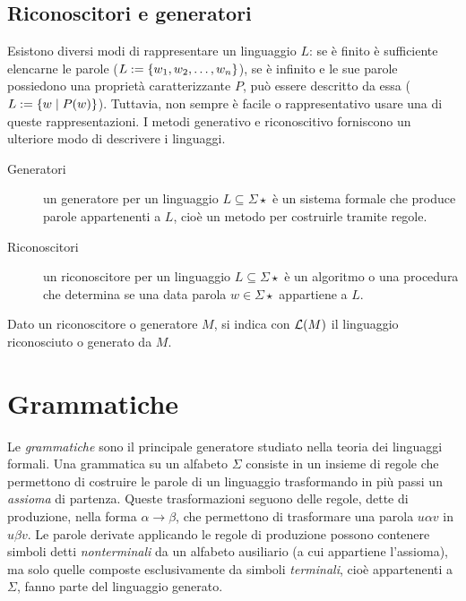 \subsection*{Riconoscitori e generatori}
Esistono diversi modi di rappresentare un linguaggio $L$: se è finito è sufficiente elencarne le parole ($L:=\left\{ w_1,w_2,\dots,w_n \right\}$), se è infinito e le sue parole possiedono una proprietà caratterizzante $P$, può essere descritto da essa ($L:=\left\{ w\mid P(w) \right\}$). Tuttavia, non sempre è facile o rappresentativo usare una di queste rappresentazioni. I metodi generativo e riconoscitivo forniscono un ulteriore modo di descrivere i linguaggi.

\begin{description}
	\item[Generatori] un generatore per un linguaggio $L\subseteq\Sigma\star$ è un sistema formale che produce parole appartenenti a $L$, cioè un metodo per costruirle tramite regole.
	\item[Riconoscitori] un riconoscitore per un linguaggio $L\subseteq\Sigma\star$ è un algoritmo o una procedura che determina se una data parola $w\in\Sigma\star$ appartiene a $L$.
\end{description}

\noindent Dato un riconoscitore o generatore $M$, si indica con $\mathcal L(M)$ il linguaggio riconosciuto o generato da $M$.



\section{Grammatiche}
Le \emph{grammatiche} sono il principale generatore studiato nella teoria dei linguaggi formali. Una grammatica su un alfabeto $\Sigma$ consiste in un insieme di regole che permettono di costruire le parole di un linguaggio trasformando in più passi un \emph{assioma} di partenza. Queste trasformazioni seguono delle regole, dette di produzione, nella forma $\alpha\to\beta$, che permettono di trasformare una parola $u\alpha v$ in $u\beta v$. Le parole derivate applicando le regole di produzione possono contenere simboli detti \emph{nonterminali} da un alfabeto ausiliario (a cui appartiene l'assioma), ma solo quelle composte esclusivamente da simboli \emph{terminali}, cioè appartenenti a $\Sigma$, fanno parte del linguaggio generato.


